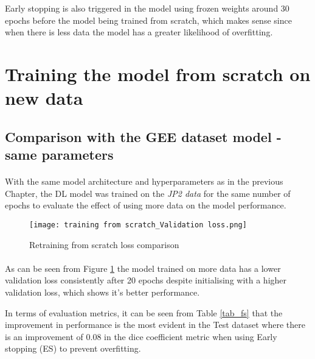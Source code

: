 Early stopping is also triggered in the model using frozen weights around 30 epochs before the model being trained from scratch, which makes sense since when there is less data the model has a greater likelihood of overfitting.

\section{Training the model from scratch on new data} \label{new_data_fs}
\subsection{Comparison with the GEE dataset model - same parameters}
\paragraph{}
With the same model architecture and hyperparameters as in the previous Chapter, the DL model was trained on the \textit{JP2 data} for the same number of epochs to evaluate the effect of using more data on the model performance.

\begin{figure}[hbt!]
    \centering
    \texttt{[image: training from scratch\_Validation loss.png]}
    \caption{Retraining from scratch loss comparison}
    \label{fs_loss}
\end{figure}
\paragraph{}
As can be seen from Figure \ref{fs_loss} the model trained on more data has a lower validation loss consistently after 20 epochs despite initialising with a higher validation loss, which shows it's better performance. 

In terms of evaluation metrics, it can be seen from Table \ref{tab_fs} that the improvement in performance is the most evident in the Test dataset where there is an improvement of 0.08 in the dice coefficient metric when using Early stopping (ES) to prevent overfitting.

